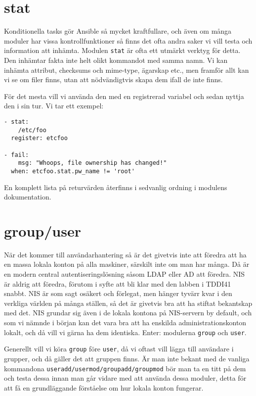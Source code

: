 \section{stat}
Konditionella tasks gör Ansible så mycket kraftfullare, och även om många moduler har vissa kontrollfunktioner så
finns det ofta andra saker vi vill testa och information att inhämta. Modulen \texttt{stat} är ofta ett utmärkt verktyg för detta. Den inhämtar fakta inte helt olikt kommandot med samma namn. Vi kan inhämta attribut, checksums och 
mime-type, ägarskap etc., men framför allt kan vi se om filer finns, utan att nödvändigtvis skapa dem ifall de inte finns.

För det mesta vill vi använda den med en registrerad variabel och sedan nyttja den i sin tur. Vi tar ett exempel:

\begin{verbatim}
- stat:
    /etc/foo
  register: etcfoo

- fail:
    msg: "Whoops, file ownership has changed!"
  when: etcfoo.stat.pw_name != 'root'
\end{verbatim}

En komplett lista på returvärden återfinns i sedvanlig ordning i modulens dokumentation.

\section{group/user}
När det kommer till användarhantering så är det givetvis inte att föredra att ha en massa lokala konton på alla 
maskiner, särskilt inte om man har många. Då är en modern central autentiseringslösning såsom LDAP eller AD att
föredra. NIS är aldrig att föredra, förutom i syfte att bli klar med den labben i TDDI41 snabbt. NIS är som sagt
osäkert och förlegat, men hänger tyvärr kvar i den verkliga världen på många ställen, så det är givetvis bra att
ha stiftat bekantskap med det. NIS grundar sig även i de lokala kontona på NIS-servern by default, och som vi
nämnde i början kan det vara bra att ha enskilda administrationskonton lokalt, och då vill vi gärna ha dem identiska. Enter: modulerna \texttt{group} och \texttt{user}.

Generellt vill vi köra \texttt{group} före \texttt{user}, då vi oftast vill lägga till användare i grupper, och då
gäller det att gruppen finns. Är man inte bekant med de vanliga kommandona \verb=useradd/usermod/groupadd/groupmod= 
bör man ta en titt på dem och testa dessa innan man går vidare med att använda dessa moduler, detta för att få en
grundläggande förståelse om hur lokala konton fungerar.

